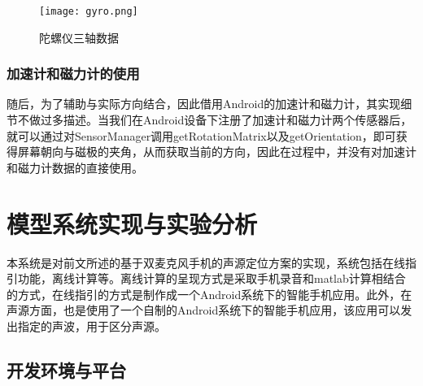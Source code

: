 \documentclass[winfonts]{njuthesis}
\begin{document}
			\begin{figure}[H]
				\centering
				\texttt{[image: gyro.png]} 
				\caption{{陀螺仪三轴数据}}
				\label{fig: gyro}
			\end{figure}
		
		\subsection{加速计和磁力计的使用}	
			
			随后，为了辅助与实际方向结合，因此借用Android的加速计和磁力计，其实现细节不做过多描述。当我们在Android设备下注册了加速计和磁力计两个传感器后，就可以通过对SensorManager调用getRotationMatrix以及getOrientation，即可获得屏幕朝向与磁极的夹角，从而获取当前的方向，因此在过程中，并没有对加速计和磁力计数据的直接使用。
			
	
\chapter{模型系统实现与实验分析}
	
	本系统是对前文所述的基于双麦克风手机的声源定位方案的实现，系统包括在线指引功能，离线计算等。离线计算的呈现方式是采取手机录音和matlab计算相结合的方式，在线指引的方式是制作成一个Android系统下的智能手机应用。此外，在声源方面，也是使用了一个自制的Android系统下的智能手机应用，该应用可以发出指定的声波，用于区分声源。
	
	
	\section{开发环境与平台}
		
\end{document}
